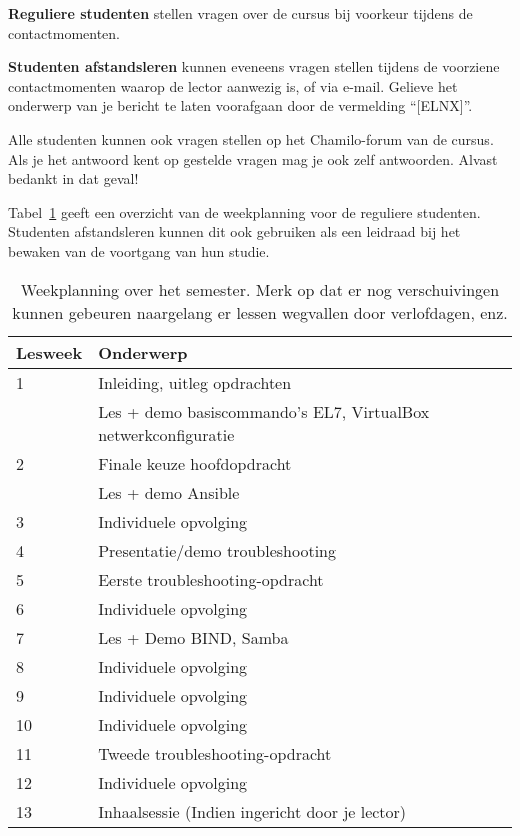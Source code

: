 \textbf{Reguliere studenten} stellen vragen over de cursus bij voorkeur tijdens de contactmomenten.

\textbf{Studenten afstandsleren} kunnen eveneens vragen stellen tijdens de voorziene contactmomenten waarop de lector aanwezig is, of via e-mail. Gelieve het onderwerp van je bericht te laten voorafgaan door de vermelding ``[ELNX]''.

Alle studenten kunnen ook vragen stellen op het Chamilo-forum van de cursus. Als je het antwoord kent op gestelde vragen mag je ook zelf antwoorden. Alvast bedankt in dat geval!

Tabel~\ref{tab:weekplanning} geeft een overzicht van de weekplanning voor de reguliere studenten. Studenten afstandsleren kunnen dit ook gebruiken als een leidraad bij het bewaken van de voortgang van hun studie.

\begin{table}
  \centering
  \begin{tabular}{ll}
    \toprule
    \textbf{Lesweek} & \textbf{Onderwerp}                                             \\
    \midrule
    1  & Inleiding, uitleg opdrachten                                   \\
       & Les + demo basiscommando's EL7, VirtualBox netwerkconfiguratie \\
    2  & Finale keuze hoofdopdracht                                     \\
       & Les + demo Ansible                                             \\
    3  & Individuele opvolging                                          \\
    4  & Presentatie/demo troubleshooting                               \\
    5  & Eerste troubleshooting-opdracht                                \\
    6  & Individuele opvolging                                          \\
    7  & Les + Demo BIND, Samba                                         \\
    8  & Individuele opvolging                                          \\
    9  & Individuele opvolging                                          \\
    10 & Individuele opvolging                                          \\
    11 & Tweede troubleshooting-opdracht                                \\
    12 & Individuele opvolging                                          \\
    13 & Inhaalsessie (Indien ingericht door je lector)
  \end{tabular}
  \caption{Weekplanning over het semester. Merk op dat er nog verschuivingen kunnen gebeuren naargelang er lessen wegvallen door verlofdagen, enz.}%
  \label{tab:weekplanning}
\end{table}

